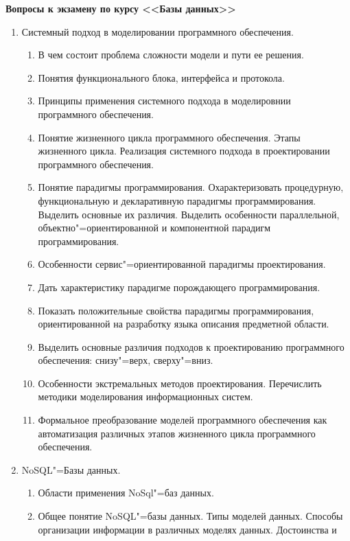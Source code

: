 \documentclass[final,a4paper,12pt]{report}
\begin{document}
\begin{center}
  \Large\bfseries Вопросы к экзамену по курсу <<Базы данных>>
\end{center}
\begin{enumerate}
\item Системный подход в моделировании программного обеспечения.
  \begin{enumerate}
  \item В чем состоит проблема сложности модели и пути ее решения.
  \item Понятия функционального блока, интерфейса и протокола.
  \item Принципы применения системного подхода в моделировнии
    программного обеспечения.
  \item Понятие жизненного цикла программного обеспечения. Этапы
    жизненного цикла.  Реализация системного подхода в проектировании
    программного обеспечения.
  \item Понятие парадигмы программирования. Охарактеризовать
    процедурную, функциональную и декларативную парадигмы
    программирования. Выделить основные их различия.  Выделить
    особенности параллельной, объектно"=ориентированной и компонентной
    парадигм программирования.
  \item Особенности сервис"=ориентированной парадигмы проектирования.
  \item Дать характеристику парадигме порождающего программирования.
  \item Показать положительные свойства парадигмы программирования,
    ориентированной на разработку языка описания предметной области.
  \item Выделить основные различия подходов к проектированию
    программного обеспечения: снизу"=верх, сверху"=вниз.
  \item Особенности экстремальных методов проектирования.  Перечислить
    методики моделирования информационных систем.
  \item Формальное преобразование моделей программного обеспечения как
    автоматизация различных этапов жизненного цикла программного
    обеспечения.
  \end{enumerate}
\item NoSQL"=Базы данных.
  \begin{enumerate}
  \item Области применения NoSql"=баз данных.
  \item Общее понятие NoSQL"=базы данных. Типы моделей данных. Способы
    организации информации в различных моделях данных. Достоинства и

\end{enumerate}
\end{enumerate}
\end{document}
